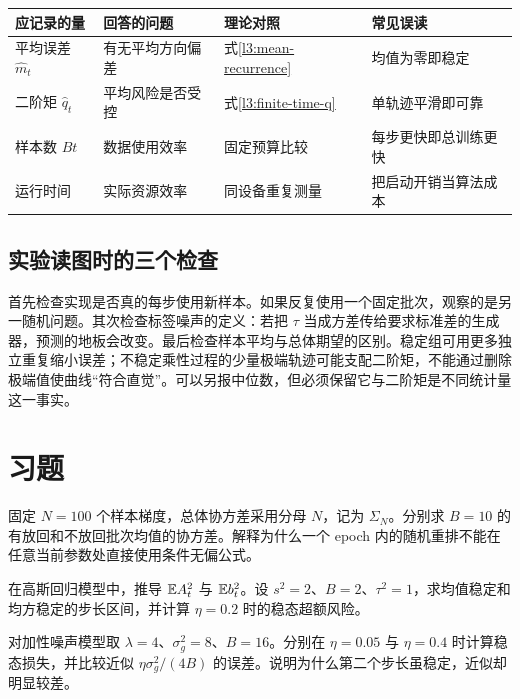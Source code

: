 \begin{center}
\small
\begin{tabularx}{\textwidth}{lXXX}
\toprule
应记录的量 & 回答的问题 & 理论对照 & 常见误读\\
\midrule
平均误差 $\widehat m_t$ & 有无平均方向偏差 & 式\eqref{l3:mean-recurrence} & 均值为零即稳定\\
二阶矩 $\widehat q_t$ & 平均风险是否受控 & 式\eqref{l3:finite-time-q} & 单轨迹平滑即可靠\\
样本数 $Bt$ & 数据使用效率 & 固定预算比较 & 每步更快即总训练更快\\
运行时间 & 实际资源效率 & 同设备重复测量 & 把启动开销当算法成本\\
\bottomrule
\end{tabularx}
\end{center}

\subsection{实验读图时的三个检查}

首先检查实现是否真的每步使用新样本。如果反复使用一个固定批次，观察的是另一随机问题。其次检查标签噪声的定义：若把 $\tau$ 当成方差传给要求标准差的生成器，预测的地板会改变。最后检查样本平均与总体期望的区别。稳定组可用更多独立重复缩小误差；不稳定乘性过程的少量极端轨迹可能支配二阶矩，不能通过删除极端值使曲线“符合直觉”。可以另报中位数，但必须保留它与二阶矩是不同统计量这一事实。

\section{习题}
\label{l3:exercises}

\begin{exercise}[抽样协方差]
\label{l3:ex-sampling}
固定 $N=100$ 个样本梯度，总体协方差采用分母 $N$，记为 $\Sigma_N$。分别求 $B=10$ 的有放回和不放回批次均值的协方差。解释为什么一个 epoch 内的随机重排不能在任意当前参数处直接使用条件无偏公式。
\end{exercise}

\begin{exercise}[精确均方递推]
\label{l3:ex-gaussian}
在高斯回归模型中，推导 $\mathbb E A_t^2$ 与 $\mathbb E b_t^2$。设 $s^2=2$、$B=2$、$\tau^2=1$，求均值稳定和均方稳定的步长区间，并计算 $\eta=0.2$ 时的稳态超额风险。
\end{exercise}

\begin{exercise}[稳态与有限时间]
\label{l3:ex-additive}
对加性噪声模型取 $\lambda=4$、$\sigma_g^2=8$、$B=16$。分别在 $\eta=0.05$ 与 $\eta=0.4$ 时计算稳态损失，并比较近似 $\eta\sigma_g^2/(4B)$ 的误差。说明为什么第二个步长虽稳定，近似却明显较差。
\end{exercise}

